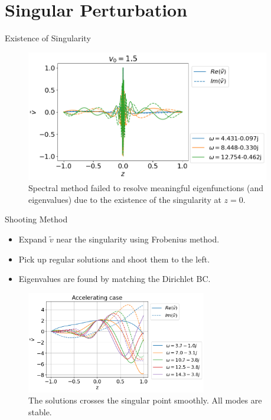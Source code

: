 \section{Singular Perturbation}
\begin{frame}{Existence of Singularity}
  \begin{figure}[htbp]
    \begin{center}
      \includegraphics[width=0.95\textwidth]{figures/results-bad-accelerating-v.png}
    \end{center}
    \caption{Spectral method failed to resolve meaningful eigenfunctions (and eigenvalues) due to the existence of the singularity at $z=0$.}
    \label{fig:bad-accelerating-v}
  \end{figure}
\end{frame}

\begin{frame}{Shooting Method}
  \begin{itemize}
    \item Expand $\tilde{v}$ near the singularity using Frobenius method.
    \item Pick up regular solutions and shoot them to the left.
    \item Eigenvalues are found by matching the Dirichlet BC.
  \end{itemize}
  \begin{figure}[htbp]
    \begin{center}
      \includegraphics[width=0.7\textwidth]{figures/results-accelerating-v.png}
    \end{center}
    \caption{The solutions crosses the singular point smoothly. All modes are stable.}
    \label{fig:good-accelerating-v}
  \end{figure}
\end{frame}

